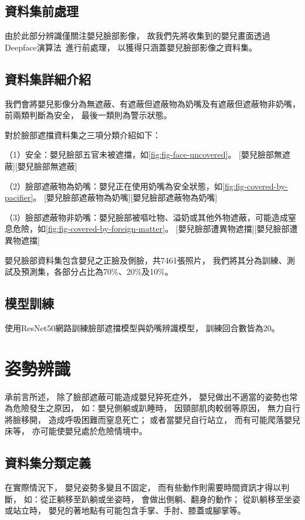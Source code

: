\documentclass[class=NCU_thesis, crop=false]{standalone}
\begin{document}
\subsection{資料集前處理}
由於此部分辨識僅關注嬰兒臉部影像，
故我們先將收集到的嬰兒畫面透過Deepface演算法~\cite{taigmanDeepFace2014}進行前處理，
以獲得只涵蓋嬰兒臉部影像之資料集。

\subsection{資料集詳細介紹}
我們會將嬰兒影像分為無遮蔽、有遮蔽但遮蔽物為奶嘴及有遮蔽但遮蔽物非奶嘴，
前兩類判斷為安全，
最後一類則為警示狀態。

對於臉部遮擋資料集之三項分類介紹如下：

（1）安全：嬰兒臉部五官未被遮擋，如\cref{fig:fig-face-uncovered}。
[嬰兒臉部無遮蔽][嬰兒臉部無遮蔽]

（2）臉部遮蔽物為奶嘴：嬰兒正在使用奶嘴為安全狀態，如\cref{fig:fig-covered-by-pacifier}。
[嬰兒臉部遮蔽物為奶嘴][嬰兒臉部遮蔽物為奶嘴]

（3）臉部遮蔽物非奶嘴：嬰兒臉部被嘔吐物、溢奶或其他外物遮蔽，可能造成窒息危險，如\cref{fig:fig-covered-by-foreign-matter}。
[嬰兒臉部遭異物遮擋][嬰兒臉部遭異物遮擋]

嬰兒臉部資料集包含嬰兒之正臉及側臉，共7461張照片，
我們將其分為訓練、測試及預測集，各部分占比為70\%、20\%及10\%。

\subsection{模型訓練}
使用ResNet50網路訓練臉部遮擋模型與奶嘴辨識模型，
訓練回合數皆為20。

\section{姿勢辨識}
承前言所述，
除了臉部遮蔽可能造成嬰兒猝死症外，
嬰兒做出不適當的姿勢也常為危險發生之原因，
如：嬰兒側躺或趴睡時，
因頸部肌肉較弱等原因，
無力自行將臉移開，
造成呼吸困難而窒息死亡；
或者當嬰兒自行站立，
而有可能爬落嬰兒床等，
亦可能使嬰兒處於危險情境中。

\subsection{資料集分類定義}
在實際情況下，
嬰兒姿勢多變且不固定，
而有些動作則需要時間資訊才得以判斷，
如：從正躺移至趴躺或坐姿時，
會做出側躺、翻身的動作；
從趴躺移至坐姿或站立時，
嬰兒的著地點有可能包含手掌、手肘、膝蓋或腳掌等。
\end{document}

